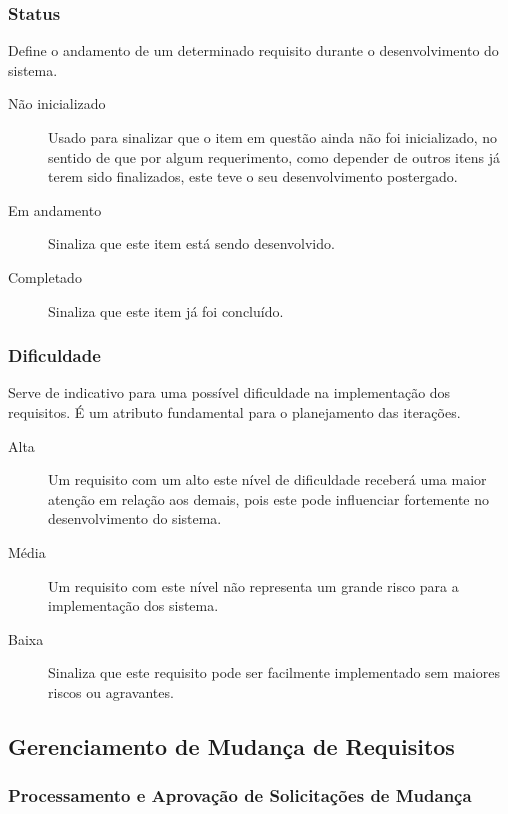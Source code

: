 \subsubsection{Status}

Define o andamento de um determinado requisito durante o desenvolvimento do sistema.

\begin{description}
\item [Não inicializado] Usado para sinalizar que o item em questão ainda não foi inicializado, no sentido de que por algum requerimento, como depender de outros itens já terem sido finalizados, este teve o seu desenvolvimento postergado.
\item [Em andamento] Sinaliza que este item está sendo desenvolvido.
\item [Completado] Sinaliza que este item já foi concluído.
\end{description}

\subsubsection{Dificuldade}

Serve de indicativo para uma possível dificuldade na implementação dos requisitos. É um atributo fundamental para o planejamento das iterações.

\begin{description}
\item [Alta] Um requisito com um alto este nível de dificuldade receberá uma maior atenção em relação aos demais, pois este pode influenciar fortemente no desenvolvimento do sistema.
\item [Média] Um requisito com este nível não representa um grande risco para a implementação dos sistema.
\item [Baixa] Sinaliza que este requisito pode ser facilmente implementado sem maiores riscos ou agravantes.
\end{description}

\subsection{Gerenciamento de Mudança de Requisitos}

\subsubsection{Processamento e Aprovação de Solicitações de Mudança}


